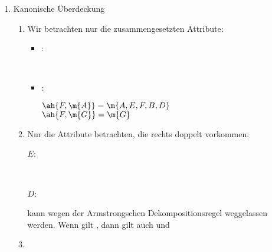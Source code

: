 \documentclass{lehramt-informatik-aufgabe}
\begin{document}
\begin{liAntwort}

\begin{enumerate}

\item Kanonische Überdeckung

\begin{enumerate}

%

\item {}

Wir betrachten nur die zusammengesetzten Attribute:

\begin{itemize}
\item {}:

 \\

\item {}:

$\ah{F, \m{A}} = \m{A, E, F, B, D}$ \\
$\ah{F, \m{G}} = \m{G}$
\end{itemize}


%

\item {}

Nur die Attribute betrachten, die rechts doppelt vorkommen:
\begin{description}

\item[$E$:] \strut

 \\

\item[$D$:] \strut


\end{description}

 kann wegen der Armstrongschen Dekompositionsregel
weggelassen werden. Wenn gilt , dann gilt auch 
und 


\item {}


\end{enumerate}
\end{enumerate}
\end{liAntwort}
\end{document}
